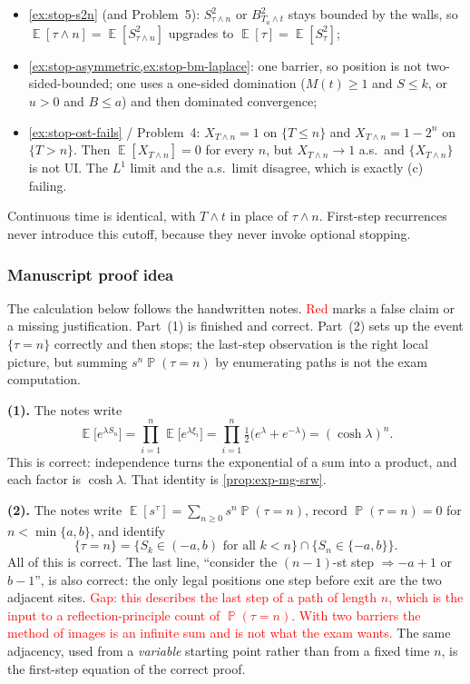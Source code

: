 \documentclass[11pt,a4paper]{article}
\newcommand{\mserr}[1]{\textcolor{red}{#1}}
\DeclareMathOperator{\E}{\mathbb{E}}
\DeclareMathOperator{\Pbb}{\mathbb{P}}
\begin{document}
\begin{remark}
\begin{itemize}
    \item
    \cref{ex:stop-s2n} (and Problem~5): \( S_{\tau\wedge n}^{2} \) or \( B_{T_a\wedge t}^{2} \) stays bounded by the walls, so \( \E[\tau\wedge n]=\E[S_{\tau\wedge n}^{2}] \) upgrades to \( \E[\tau]=\E[S_{\tau}^{2}] \);
    \item
    \cref{ex:stop-asymmetric,ex:stop-bm-laplace}: one barrier, so position is not two-sided-bounded; one uses a one-sided domination (\( M(t)\ge 1 \) and \( S\le k \), or \( u>0 \) and \( B\le a \)) and then dominated convergence;
    \item
    \cref{ex:stop-ost-fails} / Problem~4: \( X_{T\wedge n}=1 \) on \( \{T\le n\} \) and \( X_{T\wedge n}=1-2^{n} \) on \( \{T>n\} \). Then \( \E[X_{T\wedge n}]=0 \) for every \( n \), but \( X_{T\wedge n}\to 1 \) a.s.\ and \( \{X_{T\wedge n}\} \) is not UI. The \( L^{1} \) limit and the a.s.\ limit disagree, which is exactly (c) failing.
\end{itemize}

Continuous time is identical, with \( T\wedge t \) in place of \( \tau\wedge n \). First-step recurrences never introduce this cutoff, because they never invoke optional stopping.
\end{remark}

\subsubsection{Manuscript proof idea}

The calculation below follows the handwritten notes. \mserr{Red} marks a false claim or a missing justification. Part~(1) is finished and correct. Part~(2) sets up the event \( \{\tau=n\} \) correctly and then stops; the last-step observation is the right local picture, but summing \( s^{n}\Pbb(\tau=n) \) by enumerating paths is not the exam computation.

\textbf{(1).}
The notes write
\[
\E\bigl[e^{\lambda S_n}\bigr]
=
\prod_{i=1}^{n}\E\bigl[e^{\lambda\xi_i}\bigr]
=
\prod_{i=1}^{n}\tfrac12\bigl(e^{\lambda}+e^{-\lambda}\bigr)
=
(\cosh\lambda)^{n}.
\]
This is correct: independence turns the exponential of a sum into a product, and each factor is \( \cosh\lambda \). That identity is \cref{prop:exp-mg-srw}.

\textbf{(2).}
The notes write \( \E[s^{\tau}]=\sum_{n\ge 0}s^{n}\Pbb(\tau=n) \), record \( \Pbb(\tau=n)=0 \) for \( n<\min\{a,b\} \), and identify
\[
\{\tau=n\}
=
\{S_k\in(-a,b)\text{ for all }k<n\}
\cap
\{S_n\in\{-a,b\}\}.
\]
All of this is correct. The last line, ``consider the \( (n-1) \)-st step \( \Rightarrow -a+1 \) or \( b-1 \)'', is also correct: the only legal positions one step before exit are the two adjacent sites. \mserr{Gap: this describes the last step of a path of length \( n \), which is the input to a reflection-principle count of \( \Pbb(\tau=n) \). With two barriers the method of images is an infinite sum and is not what the exam wants.} The same adjacency, used from a \emph{variable} starting point rather than from a fixed time \( n \), is the first-step equation of the correct proof.
\end{document}
